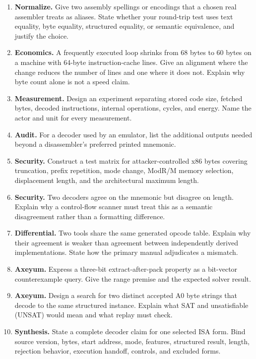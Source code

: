 \begin{enumerate}
\item \textbf{Normalize.} Give two assembly spellings or encodings that a
chosen real assembler treats as aliases. State whether your round-trip test
uses text equality, byte equality, structured equality, or semantic
equivalence, and justify the choice.

\item \textbf{Economics.} A frequently executed loop shrinks from 68 bytes to 60 bytes on a
machine with 64-byte instruction-cache lines. Give an alignment where the
change reduces the number of lines and one where it does not. Explain why byte
count alone is not a speed claim.

\item \textbf{Measurement.} Design an experiment separating stored code size,
fetched bytes, decoded instructions, internal operations, cycles, and energy.
Name the actor and unit for every measurement.

\item \textbf{Audit.} For a decoder used by an emulator, list the additional
outputs needed beyond a disassembler's preferred printed mnemonic.

\item \textbf{Security.} Construct a test matrix for attacker-controlled x86
bytes covering truncation, prefix repetition, mode change, ModR/M memory
selection, displacement length, and the architectural maximum length.

\item \textbf{Security.} Two decoders agree on the mnemonic but disagree on
length. Explain why a control-flow scanner must treat this as a semantic
disagreement rather than a formatting difference.

\item \textbf{Differential.} Two tools share the same generated opcode table.
Explain why their agreement is weaker than agreement between independently
derived implementations. State how the primary manual adjudicates a mismatch.

\item \textbf{Axeyum.} Express a three-bit extract-after-pack property as a
bit-vector counterexample query. Give the range premise and the expected
solver result.

\item \textbf{Axeyum.} Design a search for two distinct accepted A0 byte
strings that decode to the same structured instance. Explain what SAT and
unsatisfiable (UNSAT) would mean and what replay must check.

\item \textbf{Synthesis.} State a complete decoder claim for one selected ISA
form. Bind source version, bytes, start address, mode, features, structured
result, length, rejection behavior, execution handoff, controls, and excluded
forms.
\end{enumerate}
